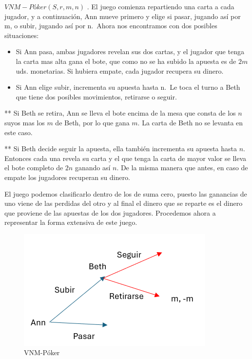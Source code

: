 \documentclass[12pt,a4paper,]{book}
\numberwithin{dummy}{section}
\theoremstyle{ocrenumbox}
\theoremstyle{blacknumex}
\theoremstyle{blacknumbox}
\theoremstyle{ocrenum}
\theoremstyle{ocrenum}
\begin{document}
\textbf{\(VNM-Póker(S,r,m,n)\)} . El juego comienza repartiendo una
carta a cada jugador, y a continuación, Ann mueve primero y elige si
pasar, jugando así por m, o subir, jugando así por n.~Ahora nos
encontramos con dos posibles situaciones:

\begin{itemize}
\item
  Si Ann pasa, ambas jugadores revelan sus dos cartas, y el jugador que
  tenga la carta mas alta gana el bote, que como no se ha subido la
  apuesta es de \(2m\) uds. monetarias. Si hubiera empate, cada jugador
  recupera su dinero.
\item
  Si Ann elige subir, incrementa su apuesta hasta n.~Le toca el turno a
  Beth que tiene dos posibles movimientos, retirarse o seguir.
\end{itemize}

** Si Beth se retira, Ann se lleva el bote encima de la mesa que consta
de los \(n\) suyos mas los \(m\) de Beth, por lo que gana \(m\). La
carta de Beth no se levanta en este caso.

** Si Beth decide seguir la apuesta, ella también incrementa su apuesta
hasta \(n\). Entonces cada una revela su carta y el que tenga la carta
de mayor valor se lleva el bote completo de \(2n\) ganando así \(n\). De
la misma manera que antes, en caso de empate los jugadores recuperan su
dinero.

El juego podemos clasificarlo dentro de los de suma cero, puesto las
ganancias de uno viene de las perdidas del otro y al final el dinero que
se reparte es el dinero que proviene de las apuestas de los dos
jugadores. Procedemos ahora a representar la forma extensiva de este
juego.

\begin{figure}[H]

{\centering \includegraphics[width=0.8\linewidth]{extensiva_VNM} 

}

\caption{\label{forma_extensiva_VNM}VNM-Póker}\label{fig:VNM_Khun}
\end{figure}
\end{document}
